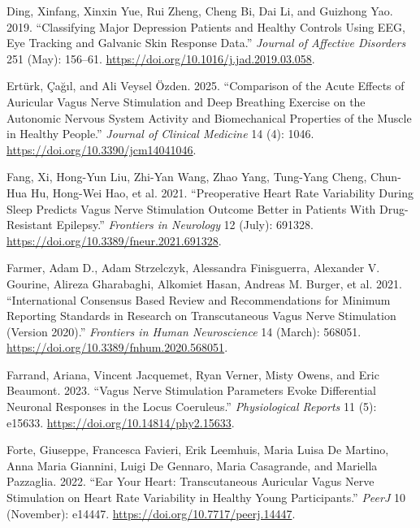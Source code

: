 \documentclass[
  Letterpaper,
]{scrbook}
\newlength{\cslhangindent}
\newenvironment{CSLReferences}[2] %
 {\begin{list}{}{%
  \setlength{\itemindent}{0pt}
  \setlength{\leftmargin}{0pt}
  \setlength{\parsep}{0pt}
  \ifodd #1
   \setlength{\leftmargin}{\cslhangindent}
   \setlength{\itemindent}{-1\cslhangindent}
  \fi
  \setlength{\itemsep}{#2\baselineskip}}}
 {\end{list}}
\begin{document}
\begin{CSLReferences}{1}{0}
Ding, Xinfang, Xinxin Yue, Rui Zheng, Cheng Bi, Dai Li, and Guizhong
Yao. 2019. {``Classifying Major Depression Patients and Healthy Controls
Using {EEG}, Eye Tracking and Galvanic Skin Response Data.''}
\emph{Journal of Affective Disorders} 251 (May): 156--61.
\url{https://doi.org/10.1016/j.jad.2019.03.058}.

Ertürk, Çağıl, and Ali Veysel Özden. 2025. {``Comparison of the {Acute
Effects} of {Auricular Vagus Nerve Stimulation} and {Deep Breathing
Exercise} on the {Autonomic Nervous System Activity} and {Biomechanical
Properties} of the {Muscle} in {Healthy People}.''} \emph{Journal of
Clinical Medicine} 14 (4): 1046.
\url{https://doi.org/10.3390/jcm14041046}.

Fang, Xi, Hong-Yun Liu, Zhi-Yan Wang, Zhao Yang, Tung-Yang Cheng,
Chun-Hua Hu, Hong-Wei Hao, et al. 2021. {``Preoperative {Heart Rate
Variability During Sleep Predicts Vagus Nerve Stimulation Outcome
Better} in {Patients With Drug-Resistant Epilepsy}.''} \emph{Frontiers
in Neurology} 12 (July): 691328.
\url{https://doi.org/10.3389/fneur.2021.691328}.

Farmer, Adam D., Adam Strzelczyk, Alessandra Finisguerra, Alexander V.
Gourine, Alireza Gharabaghi, Alkomiet Hasan, Andreas M. Burger, et al.
2021. {``International {Consensus Based Review} and {Recommendations}
for {Minimum Reporting Standards} in {Research} on {Transcutaneous Vagus
Nerve Stimulation} ({Version} 2020).''} \emph{Frontiers in Human
Neuroscience} 14 (March): 568051.
\url{https://doi.org/10.3389/fnhum.2020.568051}.

Farrand, Ariana, Vincent Jacquemet, Ryan Verner, Misty Owens, and Eric
Beaumont. 2023. {``Vagus Nerve Stimulation Parameters Evoke Differential
Neuronal Responses in the Locus Coeruleus.''} \emph{Physiological
Reports} 11 (5): e15633. \url{https://doi.org/10.14814/phy2.15633}.

Forte, Giuseppe, Francesca Favieri, Erik Leemhuis, Maria Luisa De
Martino, Anna Maria Giannini, Luigi De Gennaro, Maria Casagrande, and
Mariella Pazzaglia. 2022. {``Ear Your Heart: Transcutaneous Auricular
Vagus Nerve Stimulation on Heart Rate Variability in Healthy Young
Participants.''} \emph{PeerJ} 10 (November): e14447.
\url{https://doi.org/10.7717/peerj.14447}.


\end{CSLReferences}
\end{document}
